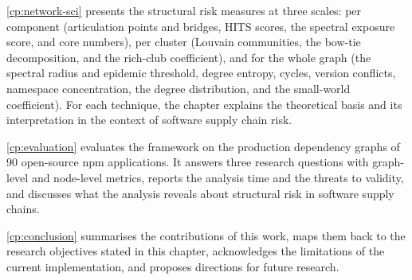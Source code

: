 \autoref{cp:network-sci} presents the structural risk measures at three scales: per component (articulation points and bridges, HITS scores, the spectral exposure score, and core numbers), per cluster (Louvain communities, the bow-tie decomposition, and the rich-club coefficient), and for the whole graph (the spectral radius and epidemic threshold, degree entropy, cycles, version conflicts, namespace concentration, the degree distribution, and the small-world coefficient). For each technique, the chapter explains the theoretical basis and its interpretation in the context of software supply chain risk.

\autoref{cp:evaluation} evaluates the framework on the production dependency graphs of 90 open-source npm applications. It answers three research questions with graph-level and node-level metrics, reports the analysis time and the threats to validity, and discusses what the analysis reveals about structural risk in software supply chains.

\autoref{cp:conclusion} summarises the contributions of this work, maps them back to the research objectives stated in this chapter, acknowledges the limitations of the current implementation, and proposes directions for future research.
